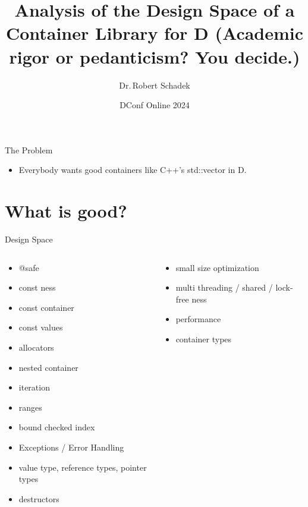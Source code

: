 \documentclass[aspectratio=169,notes]{beamer}
\title{Analysis of the Design Space of a Container Library for D (Academic rigor or pedanticism? You decide.)}
\date{DConf Online 2024}
\author{Dr.\,Robert Schadek}
\begin{document}
	\maketitle

	\begin{frame}[fragile]{The Problem}
		\begin{itemize}
			\item Everybody wants good containers like C++'s std::vector in D. 	
			\pause
		\end{itemize}
	\end{frame}

	\section{What is \textbf{good}?}


	\begin{frame}[fragile]{Design Space}
		\begin{columns}[T]
		\begin{column}{0.49\textwidth}
		\begin{itemize}
			\item @safe
			\item const ness
			\item const container
			\item const values
			\item allocators
			\item nested container
			\item iteration
			\item ranges
			\item bound checked index
			\item Exceptions / Error Handling
			\item value type, reference types, pointer types
			\item destructors
		\end{itemize}
		\end{column}
		\begin{column}{0.49\textwidth}
		\begin{itemize}
			\item small size optimization
			\item multi threading / shared / lock-free ness
			\item performance
			\item container types
		\end{itemize}
		\end{column}
		\end{columns}
	\end{frame}
\end{document}
